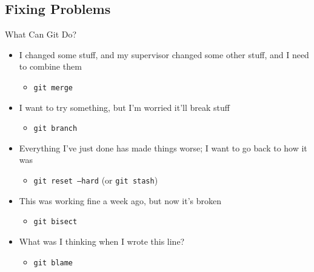 \subsection{Fixing Problems}

\begin{frame}{What Can Git Do?}
	\begin{itemize}
		\item I changed some stuff, and my supervisor changed some other stuff, and I need to combine them
		\begin{itemize}
			\item \texttt{git merge}
		\end{itemize}
		\item I want to try something, but I'm worried it'll break stuff
		\begin{itemize}
			\item \texttt{git branch}
		\end{itemize}
		\item Everything I've just done has made things worse; I want to go back to how it was
		\begin{itemize}
			\item \texttt{git reset --hard} (or \texttt{git stash})
		\end{itemize}
		\item This was working fine a week ago, but now it's broken
		\begin{itemize}
			\item \texttt{git bisect}
		\end{itemize}
		\item What was I thinking when I wrote this line?
		\begin{itemize}
			\item \texttt{git blame}
		\end{itemize}
	\end{itemize}
\end{frame}


